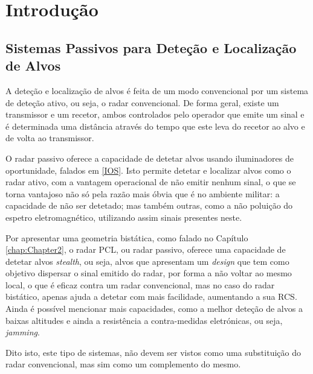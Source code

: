% 
\chapter{Introdução} %
\label{chap:Chapter1} %


%




\section{Sistemas Passivos para Deteção e Localização de Alvos}
A deteção e localização de alvos é feita de um modo convencional por um sistema de deteção ativo, ou seja, o radar convencional. De forma geral, existe um transmissor e um recetor, ambos controlados pelo operador que emite um sinal e é determinada uma distância através do tempo que este leva do recetor ao alvo e de volta ao transmissor.\par 
O radar passivo oferece a capacidade de detetar alvos usando iluminadores de oportunidade, falados em \ref{IOS}. Isto permite detetar e localizar alvos como o radar ativo, com a vantagem operacional de não emitir nenhum sinal, o que se torna vantajoso não só pela razão mais óbvia que é no ambiente militar: a capacidade de não ser detetado; mas também outras, como a não poluição do espetro eletromagnético, utilizando assim sinais presentes neste.\par 
Por apresentar uma geometria bistática, como falado no Capítulo \ref{chap:Chapter2}, o radar \gls{PCL}, ou radar passivo, oferece uma capacidade de detetar alvos \textit{stealth}, ou seja, alvos que apresentam um \textit{design} que tem como objetivo dispersar o sinal emitido do radar, por forma a não voltar ao mesmo local, o que é eficaz contra um radar convencional, mas no caso do radar bistático, apenas ajuda a detetar com mais facilidade, aumentando a sua \gls{RCS}. Ainda é possível mencionar mais capacidades, como a melhor deteção de alvos a baixas altitudes e ainda a resistência a contra-medidas eletrónicas, ou seja, \textit{jamming}.\par
Dito isto, este tipo de sistemas, não devem ser vistos como uma substituição do radar convencional, mas sim como um complemento do mesmo.

